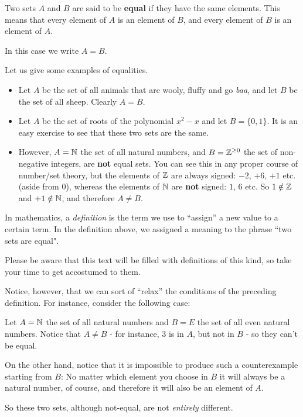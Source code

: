 \begin{df}
	Two sets $A$ and $B$ are said to be \textbf{equal} if they have the same elements. This means that every element of $A$ is an element of $B$, and every element of $B$ is an element of $A$.
	
	In this case we write $A=B$.
\end{df}

Let us give some examples of equalities.

\begin{ex}
	\begin{itemize}
		\item Let $A$ be the set of all animals that are wooly, fluffy and go \textit{baa}, and let $B$ be the set of all sheep. Clearly $A=B$.
		\item Let $A$ be the set of roots of the polynomial $x^2-x$ and let $B=\{0,1\}$. It is an easy exercise to see that these two sets are the same.
		\item However, $A=\mathbb N$ the set of all natural numbers, and $B=\mathbb{Z}^{\geq0}$ the set of non-negative integers, are \textbf{not} equal sets. You can see this in any proper course of number/set theory, but the elements of $\mathbb{Z}$ are always signed: $-2$, $+6$, $+1$ etc. (aside from $0$), whereas the elements of $\mathbb N$ are \textbf{not} signed: $1$, $6$ etc. So $1\notin\mathbb{Z}$ and $+1\notin\mathbb N$, and therefore $A\not=B$.
	\end{itemize}
\end{ex}

\begin{rmk}
	In mathematics, a \emph{definition} is the term we use to ``assign'' a new value to a certain term. In the definition above, we assigned a meaning to the phrase ``two sets are equal".
	
	Please be aware that this text will be filled with definitions of this kind, so take your time to get accostumed to them.
\end{rmk}

Notice, however, that we can sort of ``relax'' the conditions of the preceding definition. For instance, consider the following case:

\begin{ex}
	Let $A=\mathbb N$ the set of all natural numbers and $B=E$ the set of all even natural numbers. Notice that $A\not=B$ - for instance, $3$ is in $A$, but not in $B$ - so they can't be equal.
	
	On the other hand, notice that it is impossible to produce such a counterexample starting from $B$: No matter which element you choose in $B$ it will always be a natural number, of course, and therefore it will also be an element of $A$.
	
	So these two sets, although not-equal, are not \textit{entirely} different.
\end{ex}

